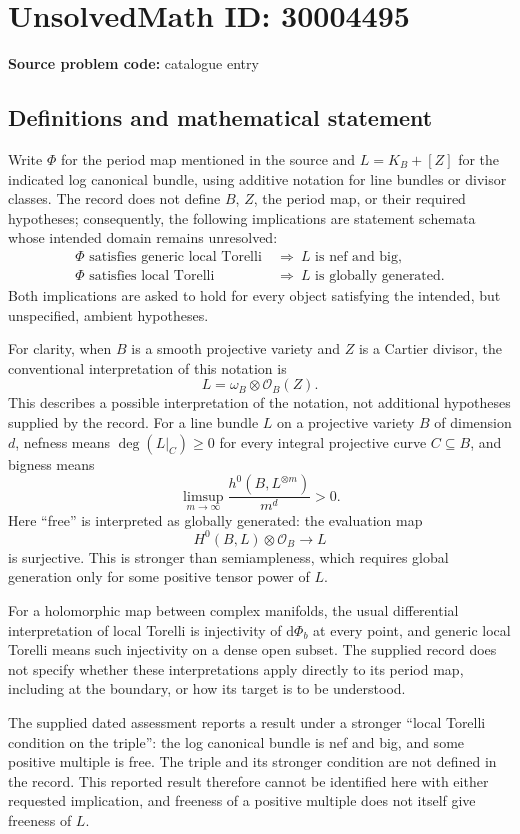 \documentclass[11pt]{article}
\begin{document}
\section*{UnsolvedMath ID: 30004495}
\textbf{Source problem code:} catalogue entry
\subsection{Definitions and mathematical statement}
Write \(\Phi\) for the period map mentioned in the source and \(L=K_B+[Z]\) for the indicated log canonical bundle, using additive notation for line bundles or divisor classes. The record does not define \(B\), \(Z\), the period map, or their required hypotheses; consequently, the following implications are statement schemata whose intended domain remains unresolved:
\[
\begin{aligned}
\Phi\text{ satisfies generic local Torelli}
&\ \Longrightarrow\ L\text{ is nef and big},\\
\Phi\text{ satisfies local Torelli}
&\ \Longrightarrow\ L\text{ is globally generated}.
\end{aligned}
\]
Both implications are asked to hold for every object satisfying the intended, but unspecified, ambient hypotheses.

For clarity, when \(B\) is a smooth projective variety and \(Z\) is a Cartier divisor, the conventional interpretation of this notation is
\[
L=\omega_B\otimes\mathcal O_B(Z).
\]
This describes a possible interpretation of the notation, not additional hypotheses supplied by the record. For a line bundle \(L\) on a projective variety \(B\) of dimension \(d\), nefness means \(\deg(L|_C)\geq 0\) for every integral projective curve \(C\subseteq B\), and bigness means
\[
\limsup_{m\to\infty}\frac{h^0(B,L^{\otimes m})}{m^d}>0.
\]
Here ``free'' is interpreted as globally generated: the evaluation map
\[
H^0(B,L)\otimes\mathcal O_B\longrightarrow L
\]
is surjective. This is stronger than semiampleness, which requires global generation only for some positive tensor power of \(L\).

For a holomorphic map between complex manifolds, the usual differential interpretation of local Torelli is injectivity of \(\mathrm d\Phi_b\) at every point, and generic local Torelli means such injectivity on a dense open subset. The supplied record does not specify whether these interpretations apply directly to its period map, including at the boundary, or how its target is to be understood.

The supplied dated assessment reports a result under a stronger ``local Torelli condition on the triple'': the log canonical bundle is nef and big, and some positive multiple is free. The triple and its stronger condition are not defined in the record. This reported result therefore cannot be identified here with either requested implication, and freeness of a positive multiple does not itself give freeness of \(L\).
\end{document}

